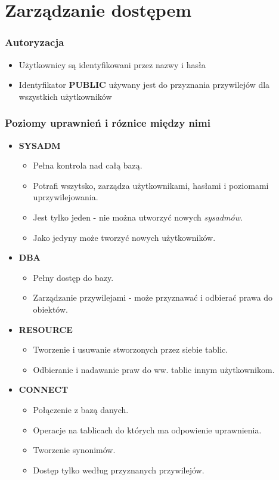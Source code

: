 \documentclass[a4paper,twoside]{article}
\begin{document}
  \part*{Zarządzanie dostępem}

  \section*{Autoryzacja}
      \begin{itemize}
      \item Użytkownicy są identyfikowani przez nazwy i hasła 
      \item Identyfikator \textbf{PUBLIC} używany jest do przyznania przywilejów dla wszystkich użytkowników
      \end{itemize}

  \section*{Poziomy uprawnień i róznice między nimi}
      \begin{itemize}
          \item \textbf{SYSADM}
          \begin{itemize}
              \item Pełna kontrola nad całą bazą.
              \item Potrafi wszytsko, zarządza użytkownikami, hasłami i poziomami uprzywilejowania.
              \item Jest tylko jeden - nie można utworzyć nowych \emph{sysadmów}.
              \item Jako jedyny może tworzyć nowych użytkowników.
          \end{itemize}
          \item \textbf{DBA}
          \begin{itemize}
              \item Pełny dostęp do bazy.
              \item Zarządzanie przywilejami - może przyznawać i odbierać prawa do obiektów.
          \end{itemize}
          \item \textbf{RESOURCE}
          \begin{itemize}
              \item Tworzenie i usuwanie stworzonych przez siebie tablic.
              \item Odbieranie i nadawanie praw do ww. tablic innym użytkownikom.
          \end{itemize}
          \item \textbf{CONNECT}
          \begin{itemize}
              \item Połączenie z bazą danych.
              \item Operacje na tablicach do których ma odpowienie uprawnienia.
              \item Tworzenie synonimów.
              \item Dostęp tylko według przyznanych przywilejów.
          \end{itemize}
      \end{itemize}
\end{document}

